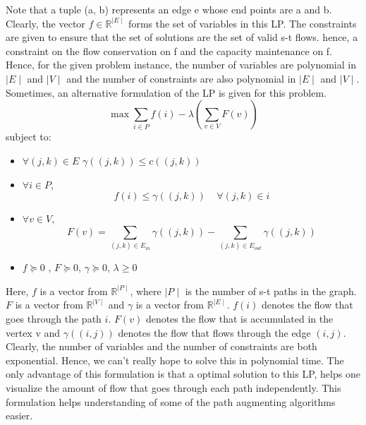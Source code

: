 \documentclass[BTech]{iitmdiss}
\begin{document}
	  Note that a tuple (a, b) represents an edge e whose end points are a and b. \\
	  
	  Clearly, the vector $f \in \mathbb{R}^{\mid E\mid }$ forms the set of variables in this LP. The constraints are given to ensure that the set of 
	  solutions are the set of valid s-t flows. hence, a constraint on the flow conservation on f and the capacity maintenance on f. Hence, for the
	  given problem instance, the number of variables are polynomial in $\mid E\mid $ and $\mid V\mid $ and the number of constraints are also polynomial in $\mid E\mid $
	  and $\mid V\mid $. \\
	  
	  Sometimes, an alternative formulation of the LP is given for this problem. 
	  $$ \max \displaystyle\sum_{i \in P} f(i) - \lambda (\displaystyle\sum_{v \in V} F(v)) $$
	  subject to:
	  
	  \begin{itemize}
	   \item 
	      $\forall (j,k) \in E$  $\gamma((j,k)) \leq c((j,k))$
	   \item
	      $\forall i \in P$, 
		$$f(i) \leq \gamma((j,k))~~~~~\forall (j,k) \in i$$
	   \item
	      $\forall v \in V$,
	      $$F(v) = \displaystyle\sum_{(j,k) \in E_{in}} \gamma((j,k)) - \displaystyle\sum_{(j,k) \in E_{out}} \gamma((j,k))$$
	   \item
	      $f \succeq 0$ , $F \succeq 0$, $\gamma \succeq 0$, $\lambda \geq 0$
	  \end{itemize}
	  
	  Here, $f$ is a vector from $\mathbb{R}^{\mid P\mid }$, where $\mid P\mid $ is the number of s-t paths in the graph. $F$ is a vector from $\mathbb{R}^{\mid V\mid }$
	  and $\gamma$ is a vector from $\mathbb{R}^{\mid E\mid }$. $f(i)$ denotes the flow that goes through the path $i$. $F(v)$ denotes the flow that 
	  is accumulated in the vertex v and $\gamma((i,j))$ denotes the flow that flows through the edge $(i,j)$. \\
	  
	  Clearly, the number of variables and the number of constraints are both exponential. Hence, we can't really hope to solve this in polynomial
	  time. The only advantage of this formulation is that a optimal solution to this LP, helps one visualize the amount of flow that goes through
	  each path independently. This formulation helps understanding of some of the path augmenting algorithms easier.
	
\end{document}
